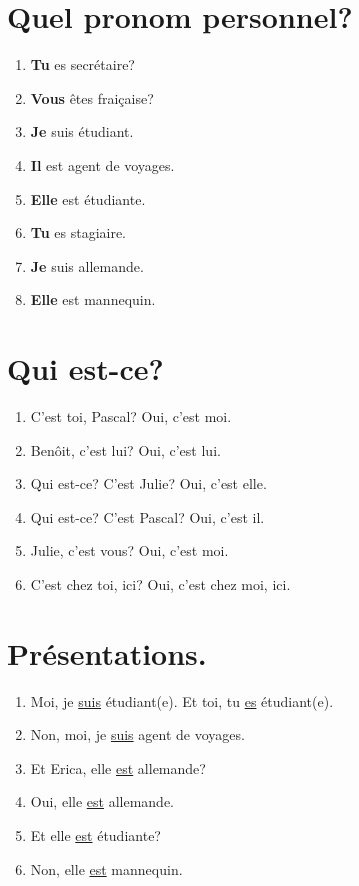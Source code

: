 \section{Quel pronom personnel?}

\begin{enumerate}
    \item \textbf{Tu} es secrétaire?
    \item \textbf{Vous} êtes fraiçaise?
    \item \textbf{Je} suis étudiant.
    \item \textbf{Il} est agent de voyages.
    \item \textbf{Elle} est étudiante.
    \item \textbf{Tu} es stagiaire.
    \item \textbf{Je} suis allemande.
    \item \textbf{Elle} est mannequin.
\end{enumerate}

\section{Qui est-ce?}

\begin{enumerate}
    \item C'est toi, Pascal? \rar Oui, c'est moi.
    \item Benôit, c'est lui? \rar Oui, c'est lui.
    \item Qui est-ce? C'est Julie? \rar Oui, c'est elle.
    \item Qui est-ce? C'est Pascal? \rar Oui, c'est il.
    \item Julie, c'est vous? \rar Oui, c'est moi.
    \item C'est chez toi, ici? \rar Oui, c'est chez moi, ici.
\end{enumerate}

\section{Présentations.}

\begin{enumerate}
    \item Moi, je \underline{suis} étudiant(e). Et toi, tu \underline{es} étudiant(e).
    \item Non, moi, je \underline{suis} agent de voyages.
    \item Et Erica, elle \underline{est} allemande?
    \item Oui, elle \underline{est} allemande.
    \item Et elle \underline{est} étudiante?
    \item Non, elle \underline{est} mannequin. 
\end{enumerate}
